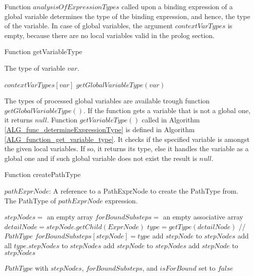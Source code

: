 Function $analysisOfExpressionTypes$ called upon a binding expression of a global variable determines the type of the binding expression, and hence, the type of the variable. In case of global variables, the argument $contextVarTypes$ is empty, because there are no local variables valid in the prolog section.

\begin{algorithm}
\caption{Function getVariableType}
\label{ALG_function_get_variable_type}
\begin{algorithmic}[1]
\ENSURE The type of variable $var$.

     \RETURN $contextVarTypes[var]$
\ELSE
     \RETURN $getGlobalVariableType(var)$
\ENDIF
\end{algorithmic}
\end{algorithm}

The types of processed global variables are available trough function \linebreak $getGlobalVariableType()$. If the function gets a variable that is not a global one, it returns $null$. Function $getVariableType()$ called in Algorithm \ref{ALG_func_determineExpressionType} is defined in Algorithm \ref{ALG_function_get_variable_type}. It checks if the specified variable is amongst the given local variables. If so, it returns its type, else it handles the variable as a global one and if such global variable does not exist the result is $null$.

\begin{algorithm}
\caption{Function createPathType}
\label{ALG_function_create_path_type}
\begin{algorithmic}[1]
\REQUIRE $pathExprNode$: A reference to a PathExprNode to create the PathType from.
\ENSURE The PathType of $pathExprNode$ expression.

\STATE $stepNodes =$ an empty array
\STATE $forBoundSubsteps =$ an empty associative array
	\STATE $detailNode = stepNode.getChild(ExprNode)$
			\STATE $type = getType(detailNode)$ // $PathType$
				\STATE $forBoundSubsteps[stepNode] = type$
				\STATE add $stepNode$ to $stepNodes$
			\ELSE
				\STATE add all $type.stepNodes$ to $stepNodes$
			\ENDIF
		\ELSE
			\STATE add $stepNode$ to $stepNodes$
		\ENDIF
	\ELSE
		\STATE add $stepNode$ to $stepNodes$
	\ENDIF
\ENDFOR

\RETURN $PathType$ with $stepNodes$, $forBoundSubsteps$, and $isForBound$ set to $false$
\end{algorithmic}
\end{algorithm}

